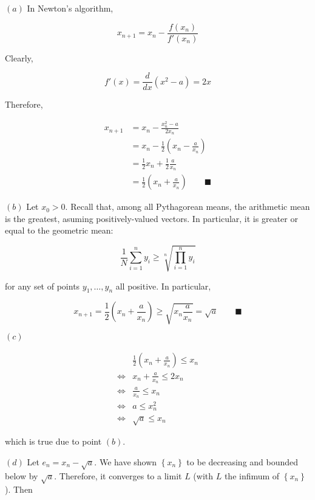 \documentclass[12pt]{article}
\theoremstyle{definition}
\begin{document}
$(a)$ In Newton's algorithm, 

\begin{equation*}
    x_{n+1} = x_n - \frac{f(x_n)}{f'(x_n)}
\end{equation*}

Clearly, 

\begin{equation*}
    f'(x) = \frac{d}{dx} (x^2 - a) = 2x
\end{equation*}

Therefore, 

\begin{align*}
    x_{n+1} 
    &= x_n - \frac{x_n^2 - a}{2x_n} \\ 
    &= x_n - \frac{1}{2}\left( x_n - \frac{a}{x_n} \right)  \\ 
    &= \frac{1}{2}x_n + \frac{1}{2} \frac{a}{x_n} \\ 
    &=\frac{1}{2}\left( x_n + \frac{a}{x_n} \right) \qquad \blacksquare
\end{align*}

$(b)$ Let $x_0 > 0$. Recall that, among all Pythagorean means, the arithmetic
mean is the greatest, asuming positively-valued vectors. In particular, it is
greater or equal to the geometric mean:

\begin{equation*}
    \frac{1}{N}\sum_{i=1}^n y_i \geq \sqrt[n]{\prod_{i=1}^n y_i} 
\end{equation*}

for any set of points $y_1, \ldots, y_n$ all positive. In particular, 

\begin{equation*}
    x_{n+1} = \frac{1}{2}\left( x_n + \frac{a}{x_n} \right) \geq \sqrt{x_n \frac{a}{x_n}}
    = \sqrt{a} \qquad \blacksquare
\end{equation*}

$(c)$  

\begin{align*}
&\frac{1}{2}\left( x_n + \frac{a}{x_n} \right) \leq x_n \\ 
\iff& x_n + \frac{a}{x_n} \leq 2x_n\\
\iff &\frac{a}{x_n} \leq x_n\\
\iff& a \leq x_n^2 \\ 
\iff& \sqrt{a} \leq x_n
\end{align*}

which is true due to point $(b)$.


$(d)$ Let $e_n = x_n - \sqrt{a} $. We have shown $\left\{ x_n \right\} $ to be
decreasing and bounded below by $\sqrt{a} $. Therefore, it converges to a limit
$L$ (with $L$ the infimum of $\left\{ x_n \right\} $). Then 
\end{document}

